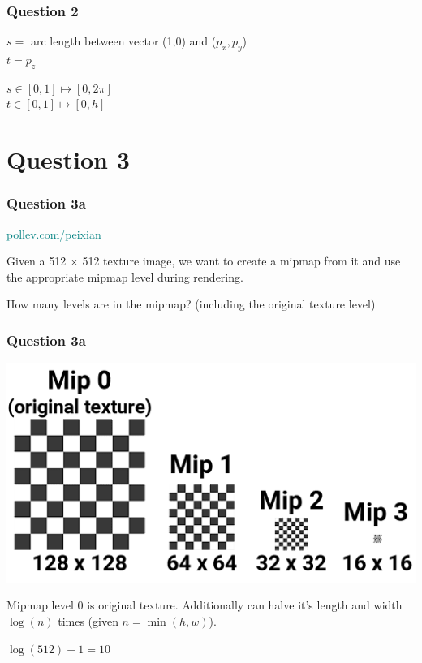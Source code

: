 \documentclass{beamer}
\begin{document}
\begin{frame}
    \frametitle{Question 2}

    \begin{tcolorbox}
        $s = $ arc length between vector (1,0) and ($p_x, p_y$) \\
        $t = p_z$
    \end{tcolorbox}

    $s \in [0, 1] \mapsto [0, 2\pi]$\\
    $t \in [0, 1] \mapsto [0, h]$\\

\end{frame}

\section{Question 3}

\begin{frame}
    \frametitle{Question 3a}

    \begin{tcolorbox}[colback=teal!5!white]
        \textcolor{teal}{pollev.com/peixian}
    \end{tcolorbox}

    Given a 512 $\times$ 512 texture image, we want to create a mipmap from it and use the appropriate mipmap level 
    during rendering. 

    \vspace{1em}

    How many levels are in the mipmap? (including the original texture level)
\end{frame}

\begin{frame}
    \frametitle{Question 3a}

    \begin{center}
        \includegraphics[scale=0.45]{mipmap-levels.png}
    \end{center}

    Mipmap level 0 is original texture. Additionally can halve it's length and width $\log(n)$ times
    (given $n = \min(h,w)$).

    \begin{tcolorbox}
        \centering
        $\log(512) + 1 = 10$
    \end{tcolorbox}

\end{frame}
\end{document}
